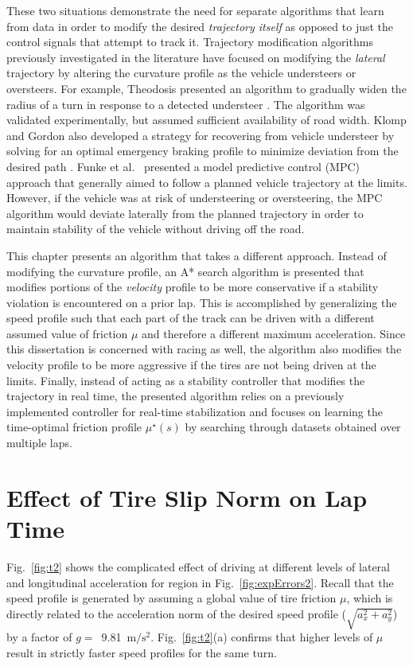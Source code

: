 {{{These two situations demonstrate the need for separate algorithms that learn from data in order to modify the desired \textit{trajectory itself}
as opposed to just the control signals that attempt to track it. Trajectory modification algorithms previously investigated in
the literature have focused on modifying the \textit{lateral} trajectory by altering the curvature profile as the vehicle understeers
or oversteers. For example, Theodosis presented 
an algorithm to gradually widen the radius of a turn in response to a detected understeer \cite{paulthesis}. The algorithm was validated
experimentally, but assumed sufficient availability of road width. Klomp and Gordon also developed a strategy for recovering from
vehicle understeer by solving for an optimal emergency braking profile to minimize deviation from the desired path \cite{klomp}. Funke et al.~\cite{funkeIV} presented a model predictive control (MPC)
approach that generally aimed
to follow a planned vehicle trajectory at the limits. However, if the vehicle was at risk of understeering or oversteering, the MPC algorithm
would deviate laterally from the planned trajectory in order to maintain stability of the vehicle without driving off the road. 

This chapter presents an algorithm that takes a different approach. Instead of modifying the curvature profile, an A*
search algorithm is presented
that modifies portions of the \textit{velocity} profile to be more conservative if a stability violation is encountered on a prior lap. This is accomplished by
generalizing the speed profile such that each part of the track can be driven with a different assumed value of friction $\mu$ and therefore a different maximum
acceleration. Since this dissertation is concerned with
racing as well, the algorithm also modifies the velocity profile to be more aggressive if the tires are not being driven at the limits. Finally,
instead of acting as a stability controller that modifies the trajectory in real time, the presented algorithm relies on a previously
implemented controller \cite{mickthesis} for real-time stabilization and focuses on learning the time-optimal friction profile $\mu^\star(s)$ by searching through datasets obtained over multiple laps. 

\section{Effect of Tire Slip Norm on Lap Time}
\label{sec:etu}

Fig.~\ref{fig:t2} shows the complicated effect of driving at different levels of lateral and longitudinal acceleration for region  in Fig.~\ref{fig:expErrors2}. Recall that the
speed profile is generated by assuming a global value of tire friction $\mu$, which is directly related to the acceleration norm of
the desired speed profile ($\sqrt{a_x^2 + a_y^2}$) by a factor of \mbox{$g =$ 9.81 $\mathrm{m/s^2}$}. Fig.~\ref{fig:t2}(a) confirms that higher levels
of $\mu$ result in strictly faster speed profiles for the same turn. 

}}}
